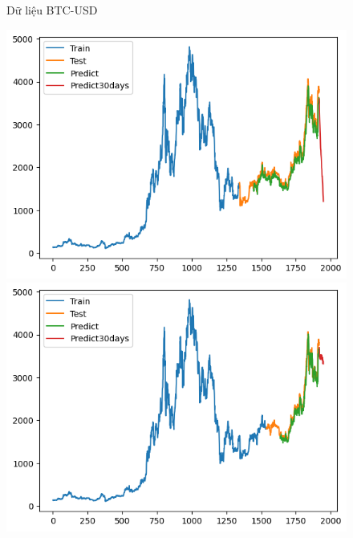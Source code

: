 \documentclass[conference]{IEEEtran}
\begin{document}
\begin{figure}[H]
\begin{minipage}{0.15\textwidth}
		\end{minipage}
		\caption{Dữ liệu BTC-USD}
		\label{fig:1}
	\end{figure}
	
	\begin{figure}[H]
		\centering
		\begin{minipage}{0.15\textwidth}
			\centering
			\includegraphics[width=1\textwidth]{Figure/TimesNet_ETH_73.png}
		\end{minipage}
		\hfill
		\begin{minipage}{0.15\textwidth}
			\centering
			\includegraphics[width=1\textwidth]{Figure/TimesNet_ETH_82.png}
		\end{minipage}
		\hfill
		\begin{minipage}{0.15\textwidth}

\end{minipage}
\end{figure}
\end{document}
